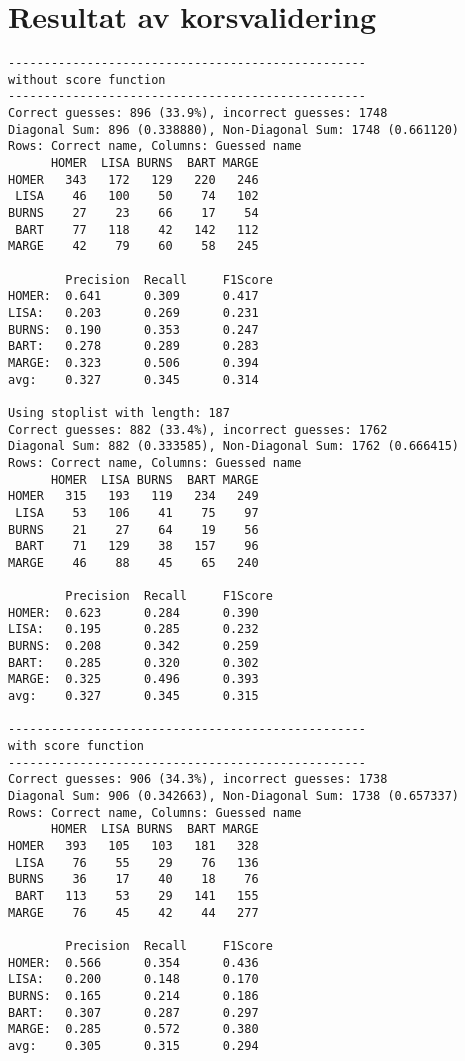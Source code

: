 \documentclass[a4paper]{article}
\begin{document}
\section{Resultat av korsvalidering}
\begin{verbatim}
--------------------------------------------------
without score function
--------------------------------------------------
Correct guesses: 896 (33.9%), incorrect guesses: 1748
Diagonal Sum: 896 (0.338880), Non-Diagonal Sum: 1748 (0.661120)
Rows: Correct name, Columns: Guessed name
      HOMER  LISA BURNS  BART MARGE 
HOMER   343   172   129   220   246 
 LISA    46   100    50    74   102 
BURNS    27    23    66    17    54 
 BART    77   118    42   142   112 
MARGE    42    79    60    58   245 

        Precision  Recall     F1Score    
HOMER:  0.641      0.309      0.417      
LISA:   0.203      0.269      0.231      
BURNS:  0.190      0.353      0.247      
BART:   0.278      0.289      0.283      
MARGE:  0.323      0.506      0.394      
avg:    0.327      0.345      0.314      

Using stoplist with length: 187
Correct guesses: 882 (33.4%), incorrect guesses: 1762
Diagonal Sum: 882 (0.333585), Non-Diagonal Sum: 1762 (0.666415)
Rows: Correct name, Columns: Guessed name
      HOMER  LISA BURNS  BART MARGE 
HOMER   315   193   119   234   249 
 LISA    53   106    41    75    97 
BURNS    21    27    64    19    56 
 BART    71   129    38   157    96 
MARGE    46    88    45    65   240 

        Precision  Recall     F1Score    
HOMER:  0.623      0.284      0.390      
LISA:   0.195      0.285      0.232      
BURNS:  0.208      0.342      0.259      
BART:   0.285      0.320      0.302      
MARGE:  0.325      0.496      0.393      
avg:    0.327      0.345      0.315      

--------------------------------------------------
with score function
--------------------------------------------------
Correct guesses: 906 (34.3%), incorrect guesses: 1738
Diagonal Sum: 906 (0.342663), Non-Diagonal Sum: 1738 (0.657337)
Rows: Correct name, Columns: Guessed name
      HOMER  LISA BURNS  BART MARGE 
HOMER   393   105   103   181   328 
 LISA    76    55    29    76   136 
BURNS    36    17    40    18    76 
 BART   113    53    29   141   155 
MARGE    76    45    42    44   277 

        Precision  Recall     F1Score    
HOMER:  0.566      0.354      0.436      
LISA:   0.200      0.148      0.170      
BURNS:  0.165      0.214      0.186      
BART:   0.307      0.287      0.297      
MARGE:  0.285      0.572      0.380      
avg:    0.305      0.315      0.294      


\end{verbatim}
\end{document}
